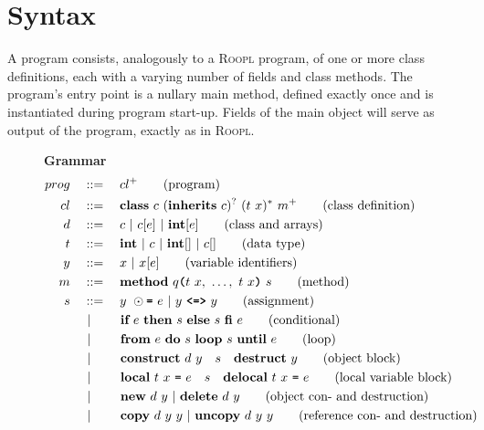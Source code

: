 \section{Syntax}
\label{sec:syntax}
A \rooplpp program consists, analogously to a \textsc{Roopl} program, of one or more class definitions, each with a varying number of fields and class methods. The program's entry point is a nullary main method, defined exactly once and is instantiated during program start-up. Fields of the main object will serve as output of the program, exactly as in \textsc{Roopl}.
\begin{figure}[h]
    \centering
    \vspace{3mm}
    \textbf{\rooplpp Grammar}
    \begin{align}
    prog		\quad&::= \quad cl^+ \tag{program}\\
    cl			\quad&::=\quad \textbf{class}\ c\ (\textbf{inherits}\ c)^?\ (t\ x)^*\ m^+\tag{class definition}\\
    d           \quad&::=\quad c\ |\ c[e]\ |\ \textbf{int}[e] \tag{class and arrays}\\
    t			\quad&::=\quad \textbf{int}\ |\ c\ |\ \textbf{int}[]\ |\ c[]\tag{data type}\\
    y          \quad&::=\quad x\ |\ x[e] \tag{variable identifiers}\\
    m			\quad&::=\quad \textbf{method}\ q\textbf{\texttt{(}}t\ x,\ \dots,\ t\ x\textbf{\texttt{)}}\ s\tag{method}\\
    s			\quad&::=\quad y\ \odot\textbf{\texttt{=}}\ e\ |\ y\ \textbf{\texttt{<=>}}\ y\tag{assignment}\\\
    			&\ |\ \qquad \textbf{if}\ e\ \textbf{then}\ s\ \textbf{else}\ s\ \textbf{fi}\ e\tag{conditional}\\
    			&\ |\ \qquad \textbf{from}\ e\ \textbf{do}\ s\ \textbf{loop}\ s\ \textbf{until}\ e\tag{loop}\\
                &\ |\ \qquad \textbf{construct}\ d\ y\quad s\quad\textbf{destruct}\ y\tag{object block}\\
                &\ |\ \qquad \textbf{local}\ t\ x\ \texttt{=}\ e\quad s\quad\textbf{delocal}\ t\ x\ \texttt{=}\ e\tag{local variable block}\\
                &\ |\ \qquad \textbf{new}\ d\ y\ |\ \textbf{delete}\ d\ y \tag{object con- and destruction}\\
                &\ |\ \qquad \textbf{copy}\ d\ y\ y\ |\ \textbf{uncopy}\ d\ y\ y \tag{reference con- and destruction}\\

\end{align}
\end{figure}
